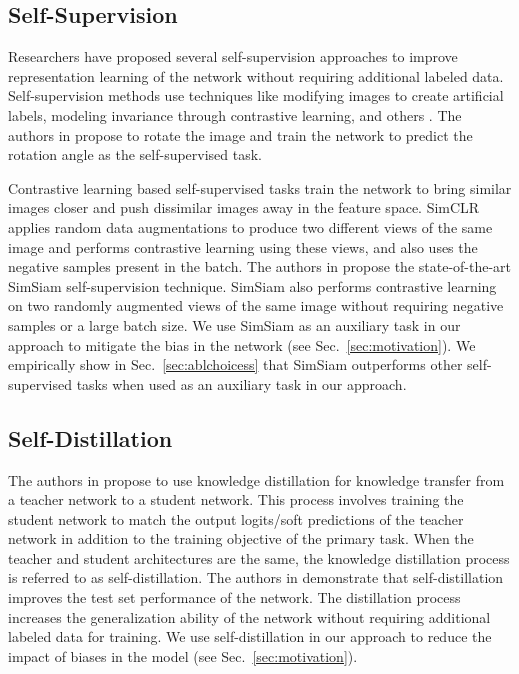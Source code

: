 \documentclass[10pt,twocolumn,letterpaper]{article}
\begin{document}
\subsection{Self-Supervision}
Researchers have proposed several self-supervision approaches to improve representation learning of the network without requiring additional labeled data. Self-supervision methods use techniques like modifying images to create artificial labels, modeling invariance through contrastive learning, and others \cite{dosovitskiy2014discriminative,zhang2016colorful}. The authors in \cite{gidaris2018unsupervised} propose to rotate the image and train the network to predict the rotation angle as the self-supervised task. 

Contrastive learning based self-supervised tasks train the network to bring similar images closer and push dissimilar images away in the feature space. SimCLR \cite{chen2020simple} applies random data augmentations to produce two different views of the same image and performs contrastive learning using these views, and also uses the negative samples present in the batch. The authors in \cite{chen2020exploring} propose the state-of-the-art SimSiam self-supervision technique. SimSiam also performs contrastive learning on two randomly augmented views of the same image without requiring negative samples or a large batch size. We use SimSiam as an auxiliary task in our approach to mitigate the bias in the network (see Sec.~\ref{sec:motivation}). We empirically show in Sec.~\ref{sec:ablchoicess} that SimSiam outperforms other self-supervised tasks when used as an auxiliary task in our approach.

\subsection{Self-Distillation}
The authors in \cite{hinton2015distill} propose to use knowledge distillation for knowledge transfer from a teacher network to a student network. This process involves training the student network to match the output logits/soft predictions of the teacher network in addition to the training objective of the primary task. When the teacher and student architectures are the same, the knowledge distillation process is referred to as self-distillation. The authors in \cite{mobahi2020selfdistillation} demonstrate that self-distillation improves the test set performance of the network. The distillation process increases the generalization ability of the network without requiring additional labeled data for training. We use self-distillation in our approach to reduce the impact of biases in the model (see Sec.~\ref{sec:motivation}).
\end{document}
